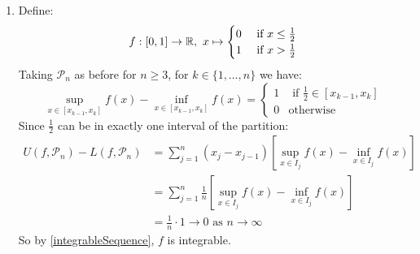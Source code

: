 \documentclass[../main.tex]{subfiles}
\begin{document}
\begin{example}
\begin{enumerate}
      \textbf{Using Riemann Integrability Sequence Criterion -- \cref{integrableSequence}}\par
      Using $(\mathcal{P}_n)$ as our sequence of events, we see that:
      \[
        U(f, \mathcal{P}_n) - L(f, \mathcal{P}_n) = \frac{1}{n} \to 0 \text{ as $n \to \infty$}
      \]
      So $f$ is integrable.
    \item Define:
      \[
        f: [0, 1] \to \mathbb{R},\ x\mapsto \begin{cases}
        0 & \text{ if } x\leq \frac{1}{2} \\
        1 & \text{ if } x > \frac{1}{2}
        \end{cases}
      \]
      Taking $\mathcal{P}_n$ as before for $n \geq 3$, for $k \in \{1, \ldots, n\}$ we have:
      \[
        \sup_{x \in [x_{k - 1}, x_{k}]} f(x) - \inf_{x \in [x_{k - 1}, x_{k}]} f(x) = \begin{cases}
        1 & \text{ if } \frac{1}{2} \in [x_{k - 1}, x_{k}] \\
        0 & \text{otherwise}
        \end{cases}
      \]
      Since $\frac{1}{2}$ can be in exactly one interval of the partition:
      \begin{align*}
        U(f, \mathcal{P}_n) - L(f, \mathcal{P}_n) &= \sum_{j = 1}^{n} (x_j - x_{j - 1}) \left[\sup_{x \in I_j} f(x) - \inf_{x \in I_j} f(x)\right] \\
                                                  &= \sum_{j = 1}^{n} \frac{1}{n} \left[\sup_{x \in I_j} f(x) - \inf_{x \in I_j} f(x)\right] \\
                                                  &= \frac{1}{n} \cdot 1 \to 0 \text{ as } n \to \infty
      \end{align*}
      So by \cref{integrableSequence}, $f$ is integrable.
  \end{enumerate}
\end{example}
\end{document}
